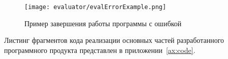\begin{figure}[!htb]
	\centering
	\texttt{[image: evaluator/evalErrorExample.png]}
	\caption{Пример завершения работы программы с ошибкой}
	\label{f:evalErrorExample}
\end{figure}

Листинг фрагментов кода реализации основных частей разработанного программного продукта представлен в приложении~\ref{ax:code}.